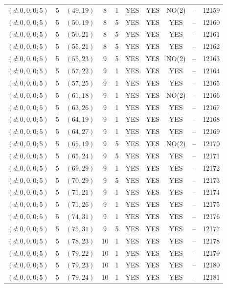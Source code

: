 \begin{longtable}{|c|c|c|c|c|c|c|c|c|c|}
$(d; 0, 0, 0; 5)$ & 5 & $(49, 19)$ & 8 & 1 & YES & YES & NO(2) & -- & 12159\\
$(d; 0, 0, 0; 5)$ & 5 & $(50, 19)$ & 8 & 5 & YES & YES & YES & -- & 12160\\
$(d; 0, 0, 0; 5)$ & 5 & $(50, 21)$ & 8 & 5 & YES & YES & YES & -- & 12161\\
$(d; 0, 0, 0; 5)$ & 5 & $(55, 21)$ & 8 & 5 & YES & YES & YES & -- & 12162\\
$(d; 0, 0, 0; 5)$ & 5 & $(55, 23)$ & 9 & 5 & YES & YES & NO(2) & -- & 12163\\
$(d; 0, 0, 0; 5)$ & 5 & $(57, 22)$ & 9 & 1 & YES & YES & YES & -- & 12164\\
$(d; 0, 0, 0; 5)$ & 5 & $(57, 25)$ & 9 & 1 & YES & YES & YES & -- & 12165\\
$(d; 0, 0, 0; 5)$ & 5 & $(61, 18)$ & 9 & 1 & YES & YES & NO(2) & -- & 12166\\
$(d; 0, 0, 0; 5)$ & 5 & $(63, 26)$ & 9 & 1 & YES & YES & YES & -- & 12167\\
$(d; 0, 0, 0; 5)$ & 5 & $(64, 19)$ & 9 & 1 & YES & YES & YES & -- & 12168\\
$(d; 0, 0, 0; 5)$ & 5 & $(64, 27)$ & 9 & 1 & YES & YES & YES & -- & 12169\\
$(d; 0, 0, 0; 5)$ & 5 & $(65, 19)$ & 9 & 5 & YES & YES & NO(2) & -- & 12170\\
$(d; 0, 0, 0; 5)$ & 5 & $(65, 24)$ & 9 & 5 & YES & YES & YES & -- & 12171\\
$(d; 0, 0, 0; 5)$ & 5 & $(69, 29)$ & 9 & 1 & YES & YES & YES & -- & 12172\\
$(d; 0, 0, 0; 5)$ & 5 & $(70, 29)$ & 9 & 5 & YES & YES & YES & -- & 12173\\
$(d; 0, 0, 0; 5)$ & 5 & $(71, 21)$ & 9 & 1 & YES & YES & YES & -- & 12174\\
$(d; 0, 0, 0; 5)$ & 5 & $(71, 26)$ & 9 & 1 & YES & YES & YES & -- & 12175\\
$(d; 0, 0, 0; 5)$ & 5 & $(74, 31)$ & 9 & 1 & YES & YES & YES & -- & 12176\\
$(d; 0, 0, 0; 5)$ & 5 & $(75, 31)$ & 9 & 5 & YES & YES & YES & -- & 12177\\
$(d; 0, 0, 0; 5)$ & 5 & $(78, 23)$ & 10 & 1 & YES & YES & YES & -- & 12178\\
$(d; 0, 0, 0; 5)$ & 5 & $(79, 22)$ & 10 & 1 & YES & YES & YES & -- & 12179\\
$(d; 0, 0, 0; 5)$ & 5 & $(79, 23)$ & 10 & 1 & YES & YES & YES & -- & 12180\\
$(d; 0, 0, 0; 5)$ & 5 & $(79, 24)$ & 10 & 1 & YES & YES & YES & -- & 12181\\

\end{longtable}
